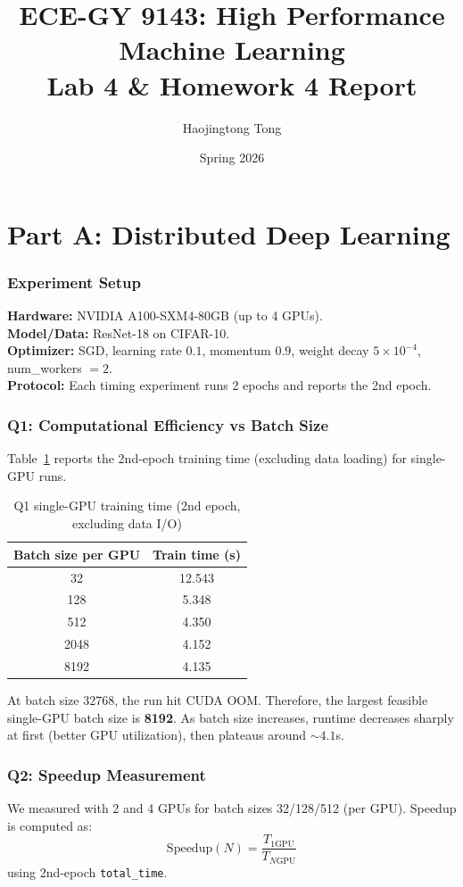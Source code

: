 \documentclass[11pt, letterpaper]{article}
\title{
  \textbf{ECE-GY 9143: High Performance Machine Learning}\\[6pt]
  \large Lab 4 \& Homework 4 Report
}
\author{Haojingtong Tong}
\date{Spring 2026}
\begin{document}
\maketitle
\tableofcontents
\newpage

\part{Part A: Distributed Deep Learning}
\setcounter{section}{0}


\section{Experiment Setup}
\textbf{Hardware:} NVIDIA A100-SXM4-80GB (up to 4 GPUs).\\
\textbf{Model/Data:} ResNet-18 on CIFAR-10.\\
\textbf{Optimizer:} SGD, learning rate $0.1$, momentum $0.9$, weight decay $5\times 10^{-4}$, num\_workers $=2$.\\
\textbf{Protocol:} Each timing experiment runs 2 epochs and reports the 2nd epoch.

\section{Q1: Computational Efficiency vs Batch Size}
Table~\ref{tab:q1} reports the 2nd-epoch training time (excluding data loading) for single-GPU runs.

\begin{table}[h]
\centering
\caption{Q1 single-GPU training time (2nd epoch, excluding data I/O)}
\label{tab:q1}
\begin{tabular}{cc}
\toprule
Batch size per GPU & Train time (s) \\
\midrule
32   & 12.543 \\
128  & 5.348 \\
512  & 4.350 \\
2048 & 4.152 \\
8192 & 4.135 \\
\bottomrule
\end{tabular}
\end{table}

At batch size 32768, the run hit CUDA OOM. Therefore, the largest feasible single-GPU batch size is \textbf{8192}.  
As batch size increases, runtime decreases sharply at first (better GPU utilization), then plateaus around $\sim 4.1$s.

\section{Q2: Speedup Measurement}
We measured with 2 and 4 GPUs for batch sizes 32/128/512 (per GPU).  
Speedup is computed as:
\[
\text{Speedup}(N)=\frac{T_{1\text{GPU}}}{T_{N\text{GPU}}}
\]
using 2nd-epoch \texttt{total\_time}.
\end{document}
